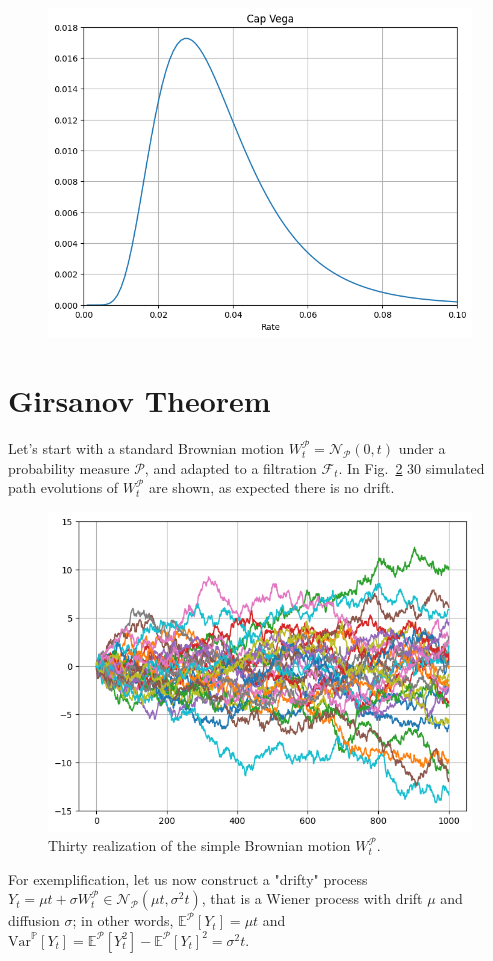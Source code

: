 \documentclass[12pt,a4paper]{article}
\begin{document}
\begin{figure}[htbp]
	\begin{center}
		\includegraphics[width=0.5\linewidth]{addons/cap_vega}
	\end{center}
	\label{fig:cap_vega}
\end{figure}

\clearpage
\section{Girsanov Theorem}
Let’s start with a standard Brownian motion $W_t^{\mathcal{P}} = \mathcal{N}_{\mathcal{P}}(0,t)$ under a probability measure $\mathcal{P}$, and adapted to a filtration $\mathcal{F}_t$. In Fig.~\ref{fig:brownian_motion_nodrift} 30 simulated path evolutions of $W_t^{\mathcal{P}}$ are shown, as expected there is no drift.
	
\begin{figure}[htbp]
	\begin{center}
		\includegraphics[width=0.5\linewidth]{addons/brownian_motion_nodrift}
	\end{center}
	\label{fig:brownian_motion_nodrift}
	\caption{Thirty realization of the simple Brownian motion $W_t^{\mathcal{P}}$.}
\end{figure}

For exemplification, let us now construct a "drifty" process $Y_t=\mu t+\sigma W_t^{\mathcal{P}}\in \mathcal{N}_{\mathcal{P}}(\mu t, \sigma^2 t)$, that is a Wiener process with drift $\mu$ and diffusion $\sigma$; in other words, $\mathbb{E}^{\mathcal{P}}[Y_t]=\mu t$ and $\text{Var}^{\mathbb{P}}[Y_t]=\mathbb{E}^{\mathcal{P}}[Y^2_t]-\mathbb{E}^{\mathcal{P}}[Y_t]^2=\sigma^2 t$.
\end{document}
